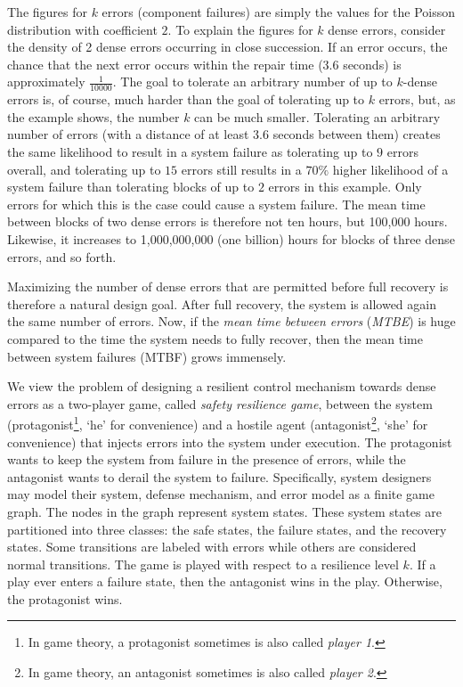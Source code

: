 %
%
The figures for $k$ errors (component failures) are simply the values 
for the Poisson distribution with coefficient $2$.
To explain the figures for $k$ dense errors, 
consider the density of 2 dense errors occurring in close succession.
If an error occurs, the chance that the next error occurs 
within the repair time (3.6 seconds) is approximately $\frac{1}{10000}$.
The goal to tolerate an arbitrary number of up to $k$-dense errors is, of course, 
much harder than the goal of tolerating up to $k$ errors, but, 
as the example shows, the number $k$ can be much smaller.   
Tolerating an arbitrary number of errors 
(with a distance of at least $3.6$ seconds between them) 
creates the same likelihood to result in a system failure 
as tolerating up to $9$ errors overall, and 
tolerating up to $15$ errors still results 
in a $70\%$ higher likelihood of a system failure 
than tolerating blocks of up to $2$ errors in this example. 
Only errors for which this is the case could cause a system failure.
The mean time between blocks of two dense errors is therefore not ten hours, 
but 100,000\label{reply2.100000} hours.
Likewise, it increases to 1,000,000,000 (one billion) hours for blocks of three dense errors, and so forth.

Maximizing the number of dense errors that are permitted before full recovery 
is therefore a natural design goal.  
After full recovery, the system is allowed again the same number of errors.
Now, if the {\em mean time between errors} ({\em MTBE}) 
is huge compared to the time the system needs to fully recover, 
then the mean time between system failures (MTBF) grows immensely. 

We view the problem of designing a resilient control mechanism 
towards dense errors as a two-player game, 
called {\em safety resilience game}, 
between the system (\label{reply1.protagonist.player1}protagonist\footnote{In game theory, a protagonist sometimes is also called {\em player 1}.}, `he' for convenience) 
and a hostile agent (antagonist\footnote{In game theory, an antagonist sometimes is also called {\em player 2}.}, `she' for convenience) 
that injects errors into the system under execution.\label{reply1.antagonist.inject.errors}   
The protagonist wants to keep the system from failure in the presence of errors, 
while the antagonist wants to derail the system to failure. 
\label{reply1.how.models} 
Specifically, 
system designers may model their system, defense mechanism, and error model 
as a finite game graph.  
The nodes in the graph represent system states.
These system states are partitioned into three classes:
the safe states, the failure states, and the recovery states. 
Some transitions are labeled with errors while others are considered normal transitions.  
The game is played with respect to a resilience level $k$.  
If a play ever enters a failure state, then the antagonist wins in the play.  
Otherwise, the protagonist wins.

